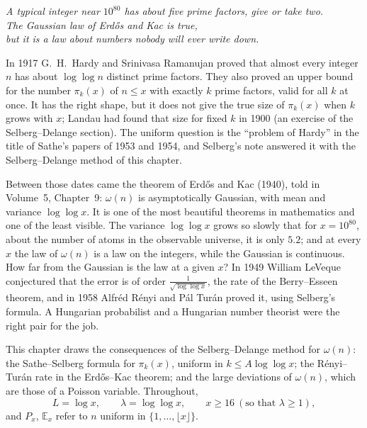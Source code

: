\begin{center}\itshape
A typical integer near $10^{80}$ has about five prime factors, give or take two.\\
The Gaussian law of Erd\H{o}s and Kac is true,\\
but it is a law about numbers nobody will ever write down.
\end{center}

In 1917 G.~H.~Hardy and Srinivasa Ramanujan proved that almost every integer $n$ has about $\log\log n$ distinct prime factors. They also proved an upper bound for the number $\pi_k(x)$ of $n\le x$ with exactly $k$ prime factors, valid for all $k$ at once. It has the right shape, but it does not give the true size of $\pi_k(x)$ when $k$ grows with $x$; Landau had found that size for fixed $k$ in 1900 (an exercise of the Selberg--Delange section). The uniform question is the ``problem of Hardy'' in the title of Sathe's papers of 1953 and 1954, and Selberg's note answered it with the Selberg--Delange method of this chapter.

Between those dates came the theorem of Erd\H{o}s and Kac (1940), told in Volume~5, Chapter~9: $\omega(n)$ is asymptotically Gaussian, with mean and variance $\log\log x$. It is one of the most beautiful theorems in mathematics and one of the least visible. The variance $\log\log x$ grows so slowly that for $x=10^{80}$, about the number of atoms in the observable universe, it is only $5.2$; and at every $x$ the law of $\omega(n)$ is a law on the integers, while the Gaussian is continuous. How far from the Gaussian is the law at a given $x$? In 1949 William LeVeque conjectured that the error is of order $\frac1{\sqrt{\log\log x}}$, the rate of the Berry--Esseen theorem, and in 1958 Alfréd Rényi and Pál Turán proved it, using Selberg's formula. A Hungarian probabilist and a Hungarian number theorist were the right pair for the job.

This chapter draws the consequences of the Selberg--Delange method for $\omega(n)$: the Sathe--Selberg formula for $\pi_k(x)$, uniform in $k\le A\log\log x$; the Rényi--Turán rate in the Erd\H{o}s--Kac theorem; and the large deviations of $\omega(n)$, which are those of a Poisson variable. Throughout,
\[
L=\log x,\qquad\lambda=\log\log x,\qquad x\ge16\ (\text{so that }\lambda\ge1),
\]
and $P_x$, $\mathbb E_x$ refer to $n$ uniform in $\{1,\dots,\lfloor x\rfloor\}$.

